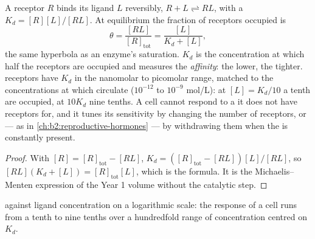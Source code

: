 \begin{theorem}\label{thm:b2:cell-signalling:occupancy}
A receptor $R$ binds its ligand $L$ reversibly, $R + L
\rightleftharpoons RL$, with a \emph{} $K_d =
[R][L]/[RL]$. At equilibrium the fraction of receptors occupied is
\[
\theta = \frac{[RL]}{[R]_{\text{tot}}} = \frac{[L]}{K_d + [L]},
\]
the same hyperbola as an enzyme's saturation. $K_d$ is the
concentration at which half the receptors are occupied and measures
the \emph{affinity}: the lower, the tighter.  receptors have
$K_d$ in the nanomolar to picomolar range, matched to the
concentrations at which  circulate ($10^{-12}$ to
$10^{-9}$ mol/L): at $[L] = K_d/10$ a tenth are occupied, at
$10K_d$ nine tenths. A cell cannot respond to a  it does not
have receptors for, and it tunes its sensitivity by changing the
number of receptors, or --- as in \cref{ch:b2:reproductive-hormones}
--- by withdrawing them when the  is constantly present.
\end{theorem}
\begin{proof}
With $[R] = [R]_{\text{tot}} - [RL]$, $K_d = ([R]_{\text{tot}} -
[RL])[L]/[RL]$, so $[RL](K_d + [L]) = [R]_{\text{tot}}[L]$, which is
the formula. It is the Michaelis--Menten expression of the Year 1
volume without the catalytic step.
\end{proof}

\begin{omfigure}

{\small {} against ligand concentration on a
logarithmic scale: the response of a cell runs from a tenth to nine
tenths over a hundredfold range of concentration centred on $K_d$.}
\end{omfigure}

